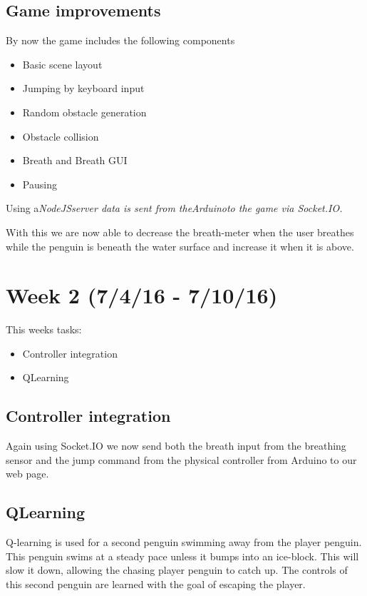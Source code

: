 \documentclass{article}
\begin{document}
    \subsection{Game improvements}
        By now the game includes the following components
        \begin{itemize}
            \item Basic scene layout
            \item Jumping by keyboard input
            \item Random obstacle generation
            \item Obstacle collision
            \item Breath and Breath GUI
            \item Pausing
        \end{itemize}

        Using a\em NodeJS\em server data is sent from the\em Arduino\em to the game via \em Socket.IO\em.

        With this we are now able to decrease the breath-meter when the user breathes while the penguin is beneath the water surface and increase it when it is above.


\section{Week 2 (7/4/16 - 7/10/16)}
    This weeks tasks:
    \begin{itemize}
        \item Controller integration
        \item QLearning
    \end{itemize}

    \subsection{Controller integration}
        Again using Socket.IO we now send both the breath input from the breathing sensor and the jump command from the physical controller from Arduino to our web page.

    \subsection{QLearning}
    Q-learning is used for a second penguin swimming away from the player penguin. This penguin swims at a steady pace unless it bumps into an ice-block. This will slow it down, allowing the chasing player penguin to catch up. The controls of this second penguin are learned with the goal of escaping the player.
\end{document}
